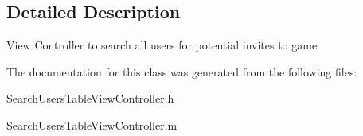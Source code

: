 \subsection{Detailed Description}
View Controller to search all users for potential invites to game 

The documentation for this class was generated from the following files\+:\begin{DoxyCompactItemize}
\item 
Search\+Users\+Table\+View\+Controller.\+h\item 
Search\+Users\+Table\+View\+Controller.\+m\end{DoxyCompactItemize}
